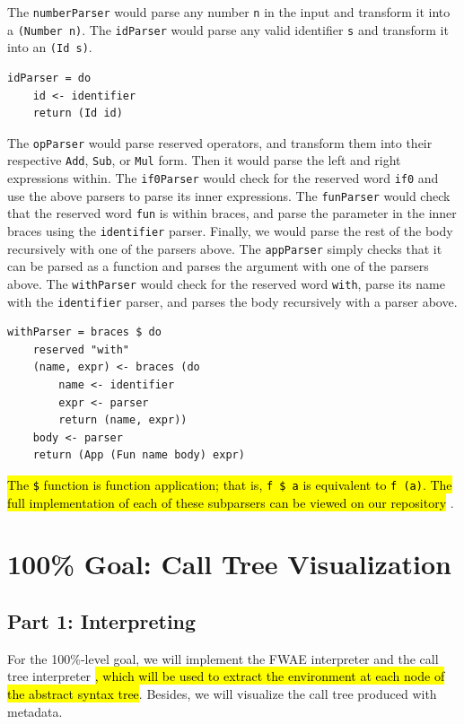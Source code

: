 \documentclass[format=acmlarge, review=false, nonacm=false, screen=true]{acmart}
\begin{document}
The \texttt{numberParser} would parse any number \texttt{n} in the input and transform it into a \texttt{(Number n)}.
The \texttt{idParser} would parse any valid identifier \texttt{s} and transform it into an \texttt{(Id s)}.
\begin{verbatim}
idParser = do
    id <- identifier
    return (Id id)
\end{verbatim}
The \texttt{opParser} would parse reserved operators, and transform them into their respective \texttt{Add}, \texttt{Sub}, or \texttt{Mul} form. Then it would parse the left and right expressions within.
The \texttt{if0Parser} would check for the reserved word \texttt{if0} and use the above parsers to parse its inner expressions.
The \texttt{funParser} would check that the reserved word \texttt{fun} is within braces, and parse the parameter in the inner braces using the \texttt{identifier} parser. Finally, we would parse the rest of the body recursively with one of the parsers above.
The \texttt{appParser} simply checks that it can be parsed as a function and parses the argument with one of the parsers above.
The \texttt{withParser} would check for the reserved word \texttt{with}, parse its name with the \texttt{identifier} parser, and parses the body recursively with a parser above.
\begin{verbatim}
withParser = braces $ do
    reserved "with"
    (name, expr) <- braces (do
        name <- identifier
        expr <- parser
        return (name, expr))
    body <- parser
    return (App (Fun name body) expr)
\end{verbatim}
\hl{The \texttt{\$} function is function application; that is, \texttt{f \$ a} is equivalent to \texttt{f (a)}. The full implementation of each of these subparsers can be viewed on our repository} \cite{fwae-parser}.



\section{100\% Goal: Call Tree Visualization}\label{interp-viz}
\subsection{Part 1: Interpreting}
For the 100\%-level goal, we will implement the FWAE interpreter and the call tree interpreter \hl{, which will be used to extract the environment at each node of the abstract syntax tree}. Besides, we will visualize the call tree produced with metadata.
\end{document}

